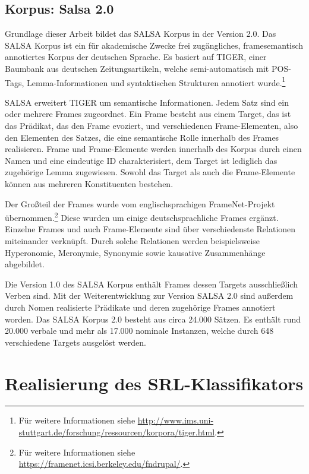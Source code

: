 \documentclass[12pt]{article}
\begin{document}
\subsection{Korpus: Salsa 2.0}

Grundlage dieser Arbeit bildet das SALSA Korpus in der Version 2.0. Das SALSA Korpus ist ein für akademische Zwecke frei zugängliches, framesemantisch annotiertes Korpus der deutschen Sprache. Es basiert auf TIGER\citep{brants_tiger_2002, tiger}, einer Baumbank aus deutschen Zeitungsartikeln, welche semi-automatisch mit POS-Tags, Lemma-Informationen und syntaktischen Strukturen annotiert wurde.\footnote{Für weitere Informationen siehe \url{http://www.ims.uni-stuttgart.de/forschung/ressourcen/korpora/tiger.html}.}

SALSA erweitert TIGER um semantische Informationen. Jedem Satz sind ein oder mehrere Frames zugeordnet. Ein Frame besteht aus einem Target, das ist das Prädikat, das den Frame evoziert, und verschiedenen Frame-Elementen, also den Elementen des Satzes, die eine semantische Rolle innerhalb des Frames realisieren. Frame und Frame-Elemente werden innerhalb des Korpus durch einen Namen und eine eindeutige ID charakterisiert, dem Target ist lediglich das zugehörige Lemma zugewiesen. Sowohl das Target als auch die Frame-Elemente können aus mehreren Konstituenten bestehen.

Der Großteil der Frames wurde vom englischsprachigen FrameNet-Projekt\citep{baker_berkeley_1998} übernommen.\footnote{Für weitere Informationen siehe \url{https://framenet.icsi.berkeley.edu/fndrupal/}.} Diese wurden um einige deutschsprachliche Frames ergänzt. Einzelne Frames und auch Frame-Elemente sind über verschiedenste Relationen miteinander verknüpft. Durch solche Relationen werden beispielsweise Hyperonomie, Meronymie, Synonymie sowie kausative Zusammenhänge abgebildet.

Die Version 1.0 des SALSA Korpus\citep{burchardt_salsa_2006} enthält Frames dessen Targets ausschließlich Verben sind. Mit der Weiterentwicklung zur Version SALSA 2.0\citep{rehbein_adding_2012} sind außerdem durch Nomen realisierte Prädikate und deren zugehörige Frames annotiert worden. Das SALSA Korpus 2.0 besteht aus circa 24.000 Sätzen. Es enthält rund 20.000 verbale und mehr als 17.000 nominale Instanzen, welche durch 648 verschiedene Targets ausgelöst werden.

\newpage
\section{Realisierung des SRL-Klassifikators}
\end{document}
